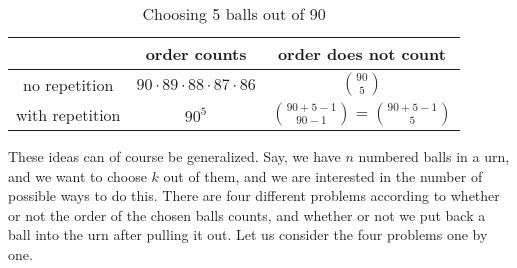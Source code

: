 \begin{table}[!htb]
\caption{Choosing 5 balls out of 90}\label{tab:90choose5}
\begin{center}
\begin{tabular}{|c||c|c|}
\hline
& order counts & order does not count \\
\hline \hline
no repetition & $90 \cdot 89 \cdot 88 \cdot 87 \cdot 86$ & $\binom{90}{5}$\\
\hline
with repetition & $90^5$ & $\binom{90+5-1}{90-1} = \binom{90+5-1}{5}$ \\
\hline
\end{tabular}
\end{center}
\end{table}


These ideas can of course be generalized. 
Say, we have $n$ numbered balls in a urn, 
and we want to choose $k$ out of them, 
and we are interested in the number of possible ways to do this. 
There are four different problems according to whether or not the order of the chosen balls counts, 
and whether or not we put back a ball into the urn after pulling it out. 
Let us consider the four problems one by one. 

